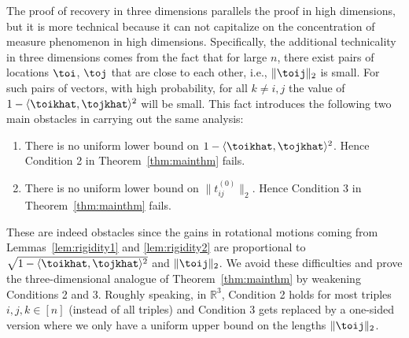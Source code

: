The proof of recovery in three dimensions parallels the proof in high dimensions, but it is more technical because it can not capitalize on the concentration of measure phenomenon in high dimensions.
Specifically, the additional technicality in three dimensions comes from the fact that
for large $n$, there exist pairs of locations $\toi$, $\toj$
that are close to each other, i.e., $\|\toij\|_2$ is small.
For such pairs of vectors, with high probability, for all $k \neq i,j$
the value of $1 - \langle \toikhat, \tojkhat \rangle^2$ will be small.
This fact introduces the following two main obstacles in carrying out the same analysis:
\begin{enumerate}
  \setlength{\itemsep}{1pt} \setlength{\parskip}{0pt}
  \setlength{\parsep}{0pt}
  \item There is no uniform lower bound on  $1 - \langle \toikhat, \tojkhat \rangle^2$.  Hence Condition 2 in Theorem~\ref{thm:mainthm} fails.
  \item There is no uniform lower bound on $\|t_{ij}^{(0)}\|_2$. Hence Condition 3 in Theorem~\ref{thm:mainthm} fails. 
\end{enumerate}
These are indeed obstacles since
the gains in rotational motions coming from Lemmas~\ref{lem:rigidity1} and \ref{lem:rigidity2}
are proportional to $\sqrt{1 - \langle \toikhat, \tojkhat \rangle^2}$ and $\| \toij \|_2$.
We avoid these difficulties and prove the three-dimensional analogue of Theorem~\ref{thm:mainthm} by weakening Conditions 2 and 3. 
Roughly speaking, in $\mathbb{R}^3$, Condition 2 holds for most triples $i,j,k \in [n]$ (instead of all triples)
and Condition 3 gets replaced by a one-sided version where we only have a uniform  upper bound on the lengths $\| \toij \|_2$.


